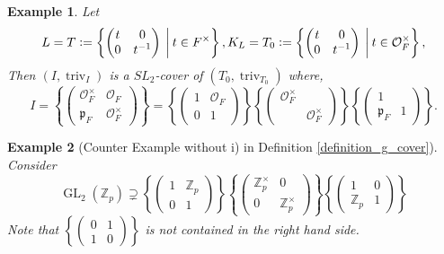 \documentclass[8pt]{article}
\newtheorem{example}{Example}[section]
\DeclareMathOperator{\triv}{triv}
\DeclareMathOperator{\GL}{GL}
\newcommand{\defeq}{\vcentcolon=}
\newcommand{\Z}[0]{\mathbb{Z}}
\newcommand{\Ouv}{\mathcal{O}}
\begin{document}
\begin{example}
  Let 
  \begin{equation*}
    L=T\defeq\left\{\begin{pmatrix}
      t & 0 \\
      0 & t^{-1}
    \end{pmatrix}
    \:\bigg{|}\:t\in F^\times\right\},K_L = T_0\defeq \left\{\begin{pmatrix}
      t & 0 \\
      0 & t^{-1}
    \end{pmatrix}
    \:\bigg{|}\:t\in \Ouv_F^\times\right\},
  \end{equation*}
  Then $(I,\triv_I)$ is a $SL_2$-cover of $(T_0,\triv_{T_0})$ where,
  \begin{equation*}
    I = \left\{\begin{pmatrix}
      \Ouv_F^\times & \Ouv_F\\
      \mathfrak{p}_F & \Ouv_F^\times
    \end{pmatrix}
    \right\} = \left\{\begin{pmatrix}
      1 & \Ouv_F\\
      0 & 1
    \end{pmatrix}
    \right\}\left\{\begin{pmatrix}
      \Ouv_F^\times & \:\\
      \: & \Ouv_F^\times
    \end{pmatrix}
    \right\}\left\{\begin{pmatrix}
      1 & \:\\
      \mathfrak{p}_F & 1
    \end{pmatrix}
    \right\}.
  \end{equation*}
\end{example}

\begin{example}[Counter Example without i) in Definition \ref{definition_g_cover}]
  Consider
  \begin{equation*}
    \GL_2(\Z_p)\supsetneq \left\{\begin{pmatrix}
      1 & \Z_p\\
      0 & 1
    \end{pmatrix}
    \right\}\left\{\begin{pmatrix}
      \Z_p^\times & 0\\
      0 & \Z_p^\times
    \end{pmatrix}
    \right\}\left\{\begin{pmatrix}
      1 & 0\\
      \Z_p & 1
    \end{pmatrix}
    \right\}
  \end{equation*}
  Note that $\left\{\begin{pmatrix}
      0 & 1\\
      1 & 0
    \end{pmatrix}
    \right\}$ is not contained in the right hand side.
\end{example}
\end{document}
